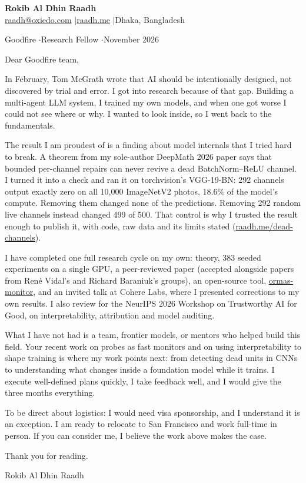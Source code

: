 \documentclass[10pt,a4paper]{article}
\begin{document}
\RaggedRight
\color{body}
\setlength{\parskip}{7pt}
{\large\bfseries\color{heading} Rokib Al Dhin Raadh}\\[1pt]
{\footnotesize \href{mailto:raadh@oxiedo.com}{raadh@oxiedo.com} \enspace$|$\enspace \href{https://www.raadh.me}{raadh.me} \enspace$|$\enspace Dhaka, Bangladesh}

\vspace{6pt}
{\small Goodfire \enspace$\cdot$\enspace Research Fellow \enspace$\cdot$\enspace November 2026}

\vspace{4pt}
Dear Goodfire team,

In February, Tom McGrath wrote that AI should be intentionally designed, not discovered by trial and error. I got into research because of that gap. Building a multi-agent LLM system, I trained my own models, and when one got worse I could not see where or why. I wanted to look inside, so I went back to the fundamentals.

The result I am proudest of is a finding about model internals that I tried hard to break. A theorem from my sole-author DeepMath 2026 paper says that bounded per-channel repairs can never revive a dead BatchNorm--ReLU channel. I turned it into a check and ran it on torchvision's VGG-19-BN: 292 channels output exactly zero on all 10,000 ImageNetV2 photos, 18.6\% of the model's compute. Removing them changed none of the predictions. Removing 292 random live channels instead changed 499 of 500. That control is why I trusted the result enough to publish it, with code, raw data and its limits stated (\href{https://www.raadh.me/dead-channels}{raadh.me/dead-channels}).

I have completed one full research cycle on my own: theory, 383 seeded experiments on a single GPU, a peer-reviewed paper (accepted alongside papers from Ren\'e Vidal's and Richard Baraniuk's groups), an open-source tool, \href{https://github.com/Oxiedo/ormas-monitor}{ormas-monitor}, and an invited talk at Cohere Labs, where I presented corrections to my own results. I also review for the NeurIPS 2026 Workshop on Trustworthy AI for Good, on interpretability, attribution and model auditing.

What I have not had is a team, frontier models, or mentors who helped build this field. Your recent work on probes as fast monitors and on using interpretability to shape training is where my work points next: from detecting dead units in CNNs to understanding what changes inside a foundation model while it trains. I execute well-defined plans quickly, I take feedback well, and I would give the three months everything.

To be direct about logistics: I would need visa sponsorship, and I understand it is an exception. I am ready to relocate to San Francisco and work full-time in person. If you can consider me, I believe the work above makes the case.

Thank you for reading.

Rokib Al Dhin Raadh
\end{document}
